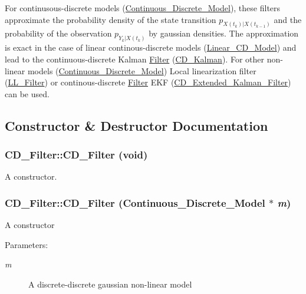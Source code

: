 For continusous-discrete models (\hyperlink{class_continuous___discrete___model}{Continuous\_\-Discrete\_\-Model}), these filters approximate the probability density of the state transition $ p_{X(t_k)|X(t_{k-1})} $ and the probability of the observation $ p_{Y_k|X(t_k)} $ by gaussian densities. The approximation is exact in the case of linear continous-discrete models (\hyperlink{class_linear___c_d___model}{Linear\_\-CD\_\-Model}) and lead to the continuous-discrete Kalman \hyperlink{class_filter}{Filter} (\hyperlink{class_c_d___kalman}{CD\_\-Kalman}). For other non-linear models (\hyperlink{class_continuous___discrete___model}{Continuous\_\-Discrete\_\-Model}) Local linearization filter (\hyperlink{class_l_l___filter}{LL\_\-Filter}) or continous-discrete \hyperlink{class_filter}{Filter} EKF (\hyperlink{class_c_d___extended___kalman___filter}{CD\_\-Extended\_\-Kalman\_\-Filter}) can be used. 

\subsection{Constructor \& Destructor Documentation}
\hypertarget{class_c_d___filter_b73ba4ee4ba0e1aaec09c8e88b8a4995}{
\subsubsection[{CD\_\-Filter}]{\setlength{\rightskip}{0pt plus 5cm}CD\_\-Filter::CD\_\-Filter (void)}}
\label{class_c_d___filter_b73ba4ee4ba0e1aaec09c8e88b8a4995}


A constructor. 

\hypertarget{class_c_d___filter_b567ec6efd08a2f8bb33f3288c730346}{
\subsubsection[{CD\_\-Filter}]{\setlength{\rightskip}{0pt plus 5cm}CD\_\-Filter::CD\_\-Filter ({\bf Continuous\_\-Discrete\_\-Model} $\ast$ {\em m})}}
\label{class_c_d___filter_b567ec6efd08a2f8bb33f3288c730346}


A constructor

\begin{Desc}
\item[Parameters:]
\begin{description}
\item[{\em m}]A discrete-discrete gaussian non-linear model \end{description}
\end{Desc}


